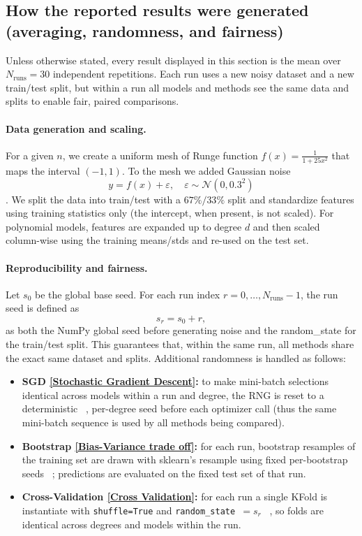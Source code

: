 \documentclass[
 reprint,            %
 amsmath,amssymb,
 aps,
]{revtex4-2}
\begin{document}
\subsection*{How the reported results were generated (averaging, randomness, and fairness)}
\label{sec:results_setup}
Unless otherwise stated, every result displayed in this section is the mean over $N_{\text{runs}}=30$ independent repetitions.
Each run uses a new noisy dataset and a new train/test split, but within a run all models and methods see the same data and splits to enable fair, paired comparisons.

\paragraph*{Data generation and scaling.}
For a given $n$, we create a uniform mesh of Runge function $f(x)=\tfrac{1}{1+25x^2}$ that maps the interval $(-1,1)$.
To the mesh we added Gaussian noise \[ y = f(x) + \varepsilon, \quad \varepsilon \sim \mathcal{N}(0, 0.3^2) \].
We split the data into train/test with a $67\%/33\%$ split and standardize features using training statistics only (the intercept, when present, is not scaled).
For polynomial models, features are expanded up to degree $d$ and then scaled column-wise using the training means/stds and re-used on the test set.

\paragraph*{Reproducibility and fairness.}
Let $s_0$ be the global base seed. For each run index $r=0,\dots,N_{\text{runs}}-1$, the run seed is defined as
\[
s_r = s_0 + r,
\]
as both the NumPy global seed before generating noise and the random\_state for the train/test split.
This guarantees that, within the same run, all methods share the exact same dataset and splits.
Additional randomness is handled as follows:
\begin{itemize}
    \item \textbf{SGD \ref{Stochastic Gradient Descent}:} to make mini-batch selections identical across models within a run and degree, the RNG is reset to a deterministic ~\cite{numpy-seed}, per-degree seed before each optimizer call (thus the same mini-batch sequence is used by all methods being compared).
    \item \textbf{Bootstrap \ref{Bias-Variance trade off}:} for each run, bootstrap resamples of the training set are drawn with sklearn's resample using fixed per-bootstrap seeds ~\cite{scikit-learn-resample}; predictions are evaluated on the fixed test set of that run.
    \item \textbf{Cross-Validation \ref{Cross Validation}:} for each run a single KFold is instantiate with \texttt{shuffle=True} and \texttt{random\_state $=s_r$} ~\cite{scikit-learn-crossvalidation}, so folds are identical across degrees and models within the run.
\end{itemize}
\end{document}
